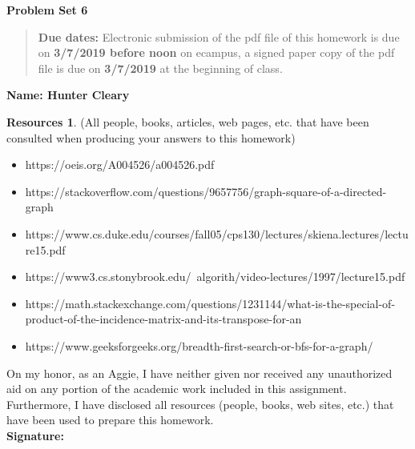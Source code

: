 \documentclass{article}
\theoremstyle{definition}
\newtheorem*{resources}{Resources}
\newcommand{\name}[1]{\noindent\textbf{Name: #1}}
\newcommand{\honor}{\noindent On my honor, as an Aggie, I have neither
  given nor received any unauthorized aid on any portion of the
  academic work included in this assignment. Furthermore, I have
  disclosed all resources (people, books, web sites, etc.) that have
  been used to prepare this homework. \\[1ex]
 \textbf{Signature:} \underline{\hspace*{5cm}} }
\newcommand{\problemset}[1]{\begin{center}\textbf{Problem Set
      #1}\end{center}}
\newcommand{\duedate}[2]{\begin{quote}\textbf{Due dates:} Electronic
    submission of the pdf file of this homework is due on
    \textbf{#1} on ecampus, a signed paper copy of the pdf file is due
    on \textbf{#2} at the beginning of class. \end{quote} }
\begin{document}
\problemset{6}
\duedate{3/7/2019 before noon}{3/7/2019}
\name{ Hunter Cleary}
\begin{resources} (All people, books, articles, web pages, etc. that
  have been consulted when producing your answers to this homework)
  \begin{itemize}
      \item https://oeis.org/A004526/a004526.pdf
      \item https://stackoverflow.com/questions/9657756/graph-square-of-a-directed-graph
      \item https://www.cs.duke.edu/courses/fall05/cps130/lectures/skiena.lectures/lecture15.pdf
      \item https://www3.cs.stonybrook.edu/~algorith/video-lectures/1997/lecture15.pdf
      \item https://math.stackexchange.com/questions/1231144/what-is-the-special-of-product-of-the-incidence-matrix-and-its-transpose-for-an
      \item https://www.geeksforgeeks.org/breadth-first-search-or-bfs-for-a-graph/
  \end{itemize}
\end{resources}
\honor

\newpage

\end{document}
